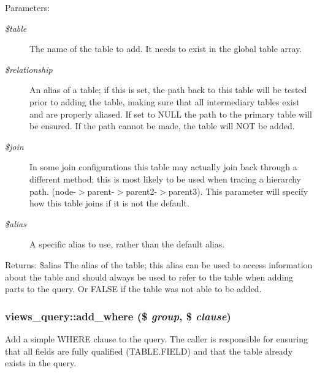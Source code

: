 \begin{Desc}
\item[Parameters:]
\begin{description}
\item[{\em \$table}]The name of the table to add. It needs to exist in the global table array. \item[{\em \$relationship}]An alias of a table; if this is set, the path back to this table will be tested prior to adding the table, making sure that all intermediary tables exist and are properly aliased. If set to NULL the path to the primary table will be ensured. If the path cannot be made, the table will NOT be added. \item[{\em \$join}]In some join configurations this table may actually join back through a different method; this is most likely to be used when tracing a hierarchy path. (node-$>$parent-$>$parent2-$>$parent3). This parameter will specify how this table joins if it is not the default. \item[{\em \$alias}]A specific alias to use, rather than the default alias.\end{description}
\end{Desc}
\begin{Desc}
\item[Returns:]\$alias The alias of the table; this alias can be used to access information about the table and should always be used to refer to the table when adding parts to the query. Or FALSE if the table was not able to be added. \end{Desc}
\hypertarget{classviews__query_88733d15379fa820cc588b11a298a3af}{
\subsubsection[{add\_\-where}]{\setlength{\rightskip}{0pt plus 5cm}views\_\-query::add\_\-where (\$ {\em group}, \/  \$ {\em clause})}}
\label{classviews__query_88733d15379fa820cc588b11a298a3af}


Add a simple WHERE clause to the query. The caller is responsible for ensuring that all fields are fully qualified (TABLE.FIELD) and that the table already exists in the query.

